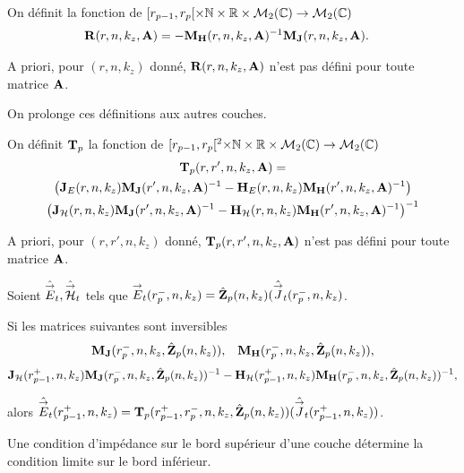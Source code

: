     \begin{defn}
      \label{def:cylindre:reflexion:impedance}
      On définit la fonction de \([r_{p-1}, r_p[\times \mathbb N \times \mathbb R \times \mathcal{M}_{2}(\mathbb C) \rightarrow \mathcal{M}_{2}(\mathbb C)\)
      \begin{align*}
        \mathbf{R}(r,n,k_z,\mathbf{A}) &= -\mathbf{M}_{\mathbf{H}}(r,n,k_z,\mathbf{A})^{-1}\mathbf{M}_{\mathbf{J}}(r,n,k_z,\mathbf{A}).
      \end{align*}
    \end{defn}
    A priori, pour \((r,n,k_z)\) donné, \(\mathbf{R}(r,n,k_z,\mathbf{A})\) n'est pas défini pour toute matrice \(\mathbf{A}\).

    On prolonge ces définitions aux autres couches.

    \begin{defn}%
      \label{def:cylindre:transfert:impedance}

      On définit \(\mathbf{T}_p\) la fonction de \([r_{p-1}, r_p[^2\times\mathbb N\times\mathbb R\times\mathcal{M}_2(\mathbb C)\rightarrow \mathcal{M}_{2}(\mathbb C)\)
      \begin{multline*}
        \mathbf{T}_p(r,r',n,k_z,\mathbf{A}) = \\
          \left(\mathbf{J}_{E}(r,n,k_z)\mathbf{M}_{\mathbf{J}}(r',n,k_z,\mathbf{A})^{-1} - \mathbf{H}_{E}(r,n,k_z)\mathbf{M}_{\mathbf{H}}(r',n,k_z,\mathbf{A})^{-1}\right) 
          \\
          \left(\mathbf{J}_{\mathcal{H}}(r,n,k_z)\mathbf{M}_{\mathbf{J}}(r',n,k_z,\mathbf{A})^{-1} - \mathbf{H}_{\mathcal{H}}(r,n,k_z)\mathbf{M}_{\mathbf{H}}(r',n,k_z,\mathbf{A})^{-1}\right)^{-1}
      \end{multline*}
    \end{defn}
    A priori, pour \((r,r',n,k_z)\) donné, \(\mathbf{T}_p(r,r',n,k_z,\mathbf{A})\) n'est pas défini pour toute matrice \(\mathbf{A}\).

    \begin{prop}%
      \label{prop:cylindre:transfert:impedance}

      Soient \(\hat{{\overset{\rightarrow}{E}}}_t,\hat{{\overset{\rightarrow}{\mathcal{H}}}}_t\) tels que \({\overset{\rightarrow}{E}}_t(r_{p}^-,n,k_z) = \hat{\mathbf{Z}}_{p}(n,k_z)(\hat{{\overset{\rightarrow}{J}}}_t(r_{p}^-,n,k_z)\).

      Si les matrices suivantes sont inversibles
      \begin{align*}
        \mathbf{M}_{\mathbf{J}}(r_p^-,n,k_z,\hat{\mathbf{Z}}_{p}(n,k_z)), && \mathbf{M}_{\mathbf{H}}(r_p^-,n,k_z,\hat{\mathbf{Z}}_{p}(n,k_z)),
      \end{align*}
      \begin{align*}
        \mathbf{J}_{\mathcal{H}}(r_{p-1}^+,n,k_z)\mathbf{M}_{\mathbf{J}}(r_{p}^-,n,k_z,\hat{\mathbf{Z}}_{p}(n,k_z))^{-1} - \mathbf{H}_{\mathcal{H}}(r_{p-1}^+,n,k_z)\mathbf{M}_{\mathbf{H}}(r_{p}^-,n,k_z,\hat{\mathbf{Z}}_{p}(n,k_z))^{-1},
      \end{align*}

      alors \(\hat{{\overset{\rightarrow}{E}}}_t(r_{p-1}^+,n,k_z) = \mathbf{T}_p(r_{p-1}^+,r_{p}^-,n,k_z,\hat{\mathbf{Z}}_{p}(n,k_z))(\hat{{\overset{\rightarrow}{J}}}_t(r_{p-1}^+,n,k_z))\).

      Une condition d'impédance sur le bord supérieur d'une couche détermine la condition limite sur le bord inférieur.
    \end{prop}


